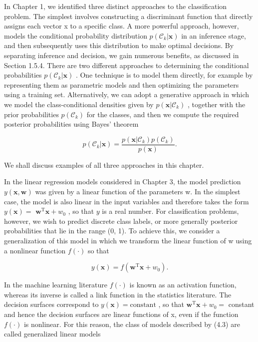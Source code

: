 \documentclass[
  10
]{article}
\begin{document}
In Chapter 1, we identified three distinct approaches to the
classification problem. The simplest involves constructing a
discriminant function that directly assigns each vector x to a specific
class. A more powerful approach, however, models the conditional
probability distribution
\(p ( \mathcal { C } _ { k } | \mathbf { x } )\) in an inference stage,
and then subsequently uses this distribution to make optimal decisions.
By separating inference and decision, we gain numerous benefits, as
discussed in Section 1.5.4. There are two different approaches to
determining the conditional probabilities
\(p ( \mathcal { C } _ { k } \vert \mathbf { x } )\) . One technique is
to model them directly, for example by representing them as parametric
models and then optimizing the parameters using a training set.
Alternatively, we can adopt a generative approach in which we model the
class-conditional densities given by
\(p ( \mathbf { x } | \mathcal { C } _ { k } )\) , together with the
prior probabilities \(p ( \mathcal { C } _ { k } )\) for the classes,
and then we compute the required posterior probabilities using Bayes'
theorem

\[
p (\mathcal {C} _ {k} | \mathbf {x}) = \frac {p (\mathbf {x} | \mathcal {C} _ {k}) p (\mathcal {C} _ {k})}{p (\mathbf {x})}.\tag{4.2}
\]

We shall discuss examples of all three approaches in this chapter.

In the linear regression models considered in Chapter 3, the model
prediction \(y ( \mathbf { x } , \mathbf { w } )\) was given by a linear
function of the parameters w. In the simplest case, the model is also
linear in the input variables and therefore takes the form
\(y ( \mathbf { x } ) =\)
\(\mathbf { w } ^ { \mathrm { T } } \mathbf { x } + w _ { 0 }\) , so
that \(y\) is a real number. For classification problems, however, we
wish to predict discrete class labels, or more generally posterior
probabilities that lie in the range (0, 1). To achieve this, we consider
a generalization of this model in which we transform the linear function
of w using a nonlinear function \(f ( \cdot )\) so that

\[
y (\mathbf {x}) = f \left(\mathbf {w} ^ {\mathrm{T}} \mathbf {x} + w _ {0}\right).\tag{4.3}
\]

In the machine learning literature \(f ( \cdot )\) is known as an
activation function, whereas its inverse is called a link function in
the statistics literature. The decision surfaces correspond to
\(y ( \mathbf { x } ) = \mathrm { c o n s t a n t }\) , so that
\(\mathbf { w } ^ { \mathrm { T } } \mathbf { x } + w _ { 0 } =\)
constant and hence the decision surfaces are linear functions of x, even
if the function \(f ( \cdot )\) is nonlinear. For this reason, the class
of models described by (4.3) are called generalized linear models
\end{document}
